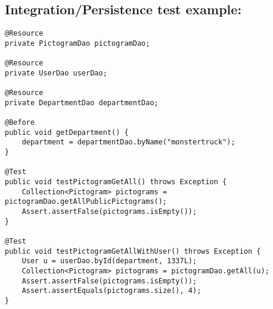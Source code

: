 \newpage
\subsection*{Integration/Persistence test example:}

\begin{lstlisting}
@Resource
private PictogramDao pictogramDao;

@Resource
private UserDao userDao;

@Resource
private DepartmentDao departmentDao;

@Before
public void getDepartment() {
    department = departmentDao.byName("monstertruck");
}

@Test
public void testPictogramGetAll() throws Exception {
    Collection<Pictogram> pictograms = pictogramDao.getAllPublicPictograms();
    Assert.assertFalse(pictograms.isEmpty());
}

@Test
public void testPictogramGetAllWithUser() throws Exception {
    User u = userDao.byId(department, 1337L);
    Collection<Pictogram> pictograms = pictogramDao.getAll(u);
    Assert.assertFalse(pictograms.isEmpty());
    Assert.assertEquals(pictograms.size(), 4);
}
\end{lstlisting}
